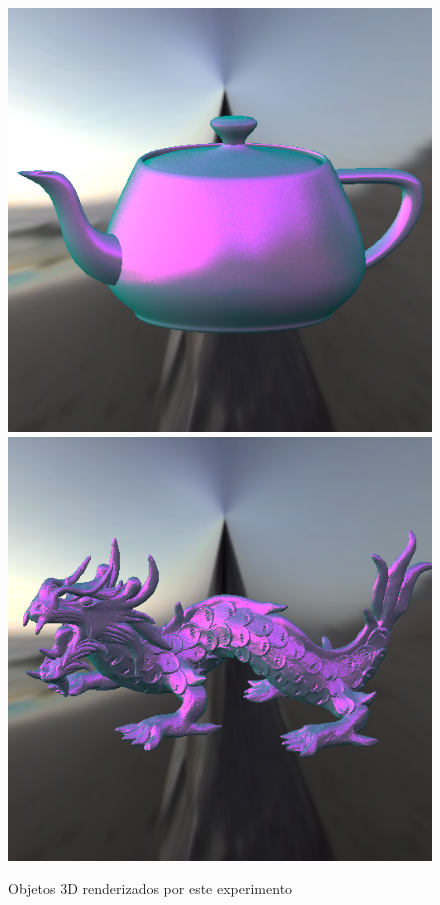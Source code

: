 \begin{figure}[H]
    \caption{\small{Objetos 3D renderizados por este experimento}}\label{fig-blinn-phong-eqlang}
  \includegraphics[width=\linewidth]{./Imagens/brdfs/blinn-phong-teapot.png}
\endminipage\hfill
{}
  \includegraphics[width=\linewidth]{./Imagens/brdfs/blinn-phong-dragon.png}

\end{figure}
